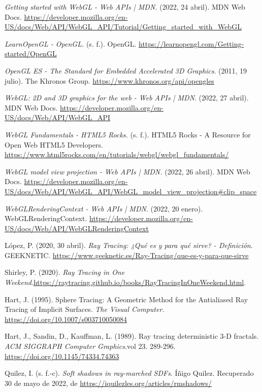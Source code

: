 \begin{thebibliography}{99}
 \textit{Getting started with WebGL - Web APIs | MDN.} (2022, 24 abril). MDN Web Docs. \url{https://developer.mozilla.org/en-US/docs/Web/API/WebGL_API/Tutorial/Getting_started_with_WebGL}

 \textit{LearnOpenGL - OpenGL.} (s. f.). OpenGL. \url{https://learnopengl.com/Getting-started/OpenGL}

 \textit{OpenGL ES - The Standard for Embedded Accelerated 3D Graphics}. (2011, 19 julio). The Khronos Group. \url{https://www.khronos.org/api/opengles}

 \textit{WebGL: 2D and 3D graphics for the web - Web APIs | MDN}. (2022, 27 abril). MDN Web Docs. \url{https://developer.mozilla.org/en-US/docs/Web/API/WebGL_API}

 \textit{WebGL Fundamentals - HTML5 Rocks.} (s. f.). HTML5 Rocks - A Resource for Open Web HTML5 Developers. \url{https://www.html5rocks.com/en/tutorials/webgl/webgl_fundamentals/}

 \textit{WebGL model view projection - Web APIs | MDN.} (2022, 26 abril). MDN Web Docs. \url{https://developer.mozilla.org/en-US/docs/Web/API/WebGL_API/WebGL_model_view_projection#clip_space}

 \textit{WebGLRenderingContext - Web APIs | MDN}. (2022, 20 enero). WebGLRenderingContext. \url{https://developer.mozilla.org/en-US/docs/Web/API/WebGLRenderingContext}

 López, P. (2020, 30 abril). \textit{Ray Tracing: ¿Qué es y para qué sirve? - Definición}. GEEKNETIC. \url{https://www.geeknetic.es/Ray-Tracing/que-es-y-para-que-sirve}

 Shirley, P. (2020). \textit{Ray Tracing in One Weekend}.\url{https://raytracing.github.io/books/RayTracingInOneWeekend.html}.

 Hart, J. (1995). Sphere Tracing: A Geometric Method for the Antialiased Ray Tracing of Implicit Surfaces. \textit{The Visual Computer}. \url{https://doi.org/10.1007/s003710050084}

 Hart, J., Sandin, D., Kauffman, L. (1989). Ray tracing deterministic 3-D fractals. \textit{ACM SIGGRAPH Computer Graphics}.vol 23. 289-296. \url{https://doi.org/10.1145/74334.74363} 

 Quilez, I. (s. f.-c). \textit{Soft shadows in ray-marched SDFs}. Íñigo Quilez. Recuperado 30 de mayo de 2022, de \url{https://iquilezles.org/articles/rmshadows/}


\end{thebibliography}
